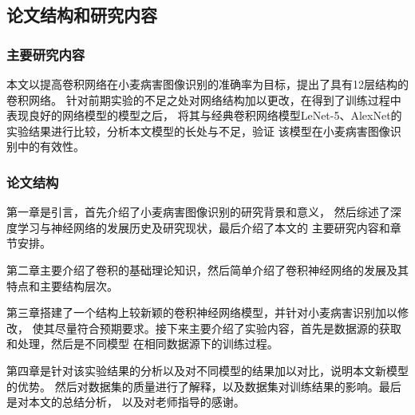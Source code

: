 \subsection{\hei\xiaosan\textbf{论文结构和研究内容}}
  \subsubsection{\hei\sihao\textbf{主要研究内容}}
    本文以提高卷积网络在小麦病害图像识别的准确率为目标，提出了具有12层结构的卷积网络。
    针对前期实验的不足之处对网络结构加以更改，在得到了训练过程中表现良好的网络模型的模型之后，
    将其与经典卷积网络模型LeNet-5、AlexNet的实验结果进行比较，分析本文模型的长处与不足，验证
    该模型在小麦病害图像识别中的有效性。
    

  \subsubsection{\hei\sihao\textbf{论文结构}}
    第一章是引言，首先介绍了小麦病害图像识别的研究背景和意义，
    然后综述了深度学习与神经网络的发展历史及研究现状，最后介绍了本文的
    主要研究内容和章节安排。

    第二章主要介绍了卷积的基础理论知识，然后简单介绍了卷积神经网络的发展及其特点和主要结构层次。

    第三章搭建了一个结构上较新颖的卷积神经网络模型，并针对小麦病害识别加以修改，
    使其尽量符合预期要求。接下来主要介绍了实验内容，首先是数据源的获取和处理，然后是不同模型
    在相同数据源下的训练过程。

    第四章是针对该实验结果的分析以及对不同模型的结果加以对比，说明本文新模型的优势。
    然后对数据集的质量进行了解释，以及数据集对训练结果的影响。最后是对本文的总结分析，
    以及对老师指导的感谢。